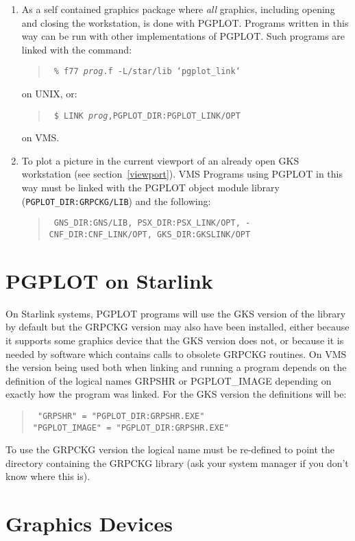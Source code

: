 \begin{enumerate}
\item As a self contained graphics package where {\em all} graphics, including
opening and closing the workstation, is done with PGPLOT. Programs written in
this way can be run with other implementations of PGPLOT. Such programs
are linked with the command:
\begin{quote}\tt
\% f77 {\em prog}.f -L/star/lib `pgplot\_link`
\end{quote}
on UNIX, or:
\begin{quote}\tt
\$ LINK {\em prog},PGPLOT\_DIR:PGPLOT\_LINK/OPT
\end{quote}
on VMS.

\item To plot a picture in the current viewport of an already open GKS
workstation (see section~\ref{viewport}). VMS Programs using PGPLOT in this 
way must
be linked with the PGPLOT object module library ({\tt PGPLOT\_DIR:GRPCKG/LIB})
and the following:
\begin{quote}\tt
GNS\_DIR:GNS/LIB, PSX\_DIR:PSX\_LINK/OPT, -\\
CNF\_DIR:CNF\_LINK/OPT, GKS\_DIR:GKSLINK/OPT 
\end{quote}
\end{enumerate}

\section{PGPLOT on Starlink}

On Starlink systems, PGPLOT programs will use the GKS version of the library by
default but the GRPCKG version may also have been installed, either because it
supports some graphics device that the GKS version does not, or because it is
needed by software which contains calls to obsolete GRPCKG routines. On VMS the
version being used both when linking and running a program depends on the
definition of the logical names GRPSHR or PGPLOT\_IMAGE depending on exactly how
the program was linked. For the GKS version the definitions
will be:
\begin{quote}\tt
"GRPSHR" = "PGPLOT\_DIR:GRPSHR.EXE"\\
"PGPLOT\_IMAGE" = "PGPLOT\_DIR:GRPSHR.EXE"
\end{quote}
To use the GRPCKG version the logical name must be re-defined to point the
directory containing the GRPCKG library (ask your system manager if you
don't know where this is).

\section{Graphics Devices}\label{GraphicsDevices}

